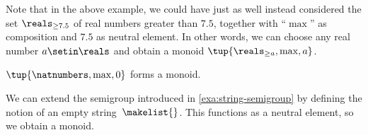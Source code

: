 \begin{remark}
    Note that in the above example, we could have just as well instead considered the set $\reals_{\geq 7.5}$ of real numbers greater than $7.5$, together with ``$\max$'' as composition and $7.5$ as neutral element.
    In other words, we can choose any real number $a \setin \reals$ and obtain a monoid $\tup{\reals_{\geq a},\max, a}$.
\end{remark}

\begin{example}
    $\tup{\natnumbers, \max,0}$ forms a monoid.
\end{example}

\begin{example}
    \label{exa:string-monoid}
    We can extend the semigroup introduced in \cref{exa:string-semigroup} by defining the notion of an empty string~$\makelist{}$.
    This functions as a neutral element, so we obtain a monoid.
\end{example}

%
%
%
%

